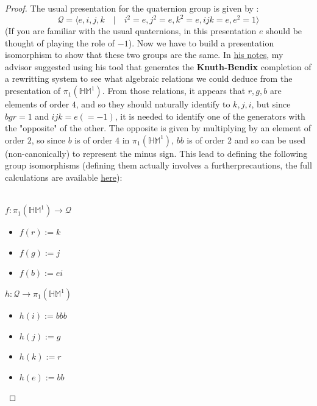 \documentclass{report}
\begin{document}
\begin{proof} The usual presentation for the quaternion group is given by : 
  $$\mathcal{Q}  = \langle e,i,j,k \quad \vert \quad i^2 =e, j^2=e, k^2=e, ijk=e, e^2=1 \rangle$$
  (If you are familiar with the usual quaternions, in this presentation $e$ should be thought of  playing the role of $-1$).
  Now we have to build a presentation isomorphism to show that these two groups are the same. In \href{https://github.com/dlaird-ens/Stage-L3/blob/main/Rapport/annexes/hypercubic.pdf}{his notes}, my advisor suggested using his tool that generates the \textbf{Knuth-Bendix} completion of a rewritting system to see what algebraic relations we could deduce from the presentation of $\pi_1(\mathbb{HM}^1)$. From those relations, it appears that $r,g,b$ are elements of order $4$, and so they should naturally identify to $k,j,i$, but since $bgr=1$ and $ijk=e(=-1)$, it is needed to identify one of the generators with the "opposite" of the other. The opposite is given by multiplying by an element of order $2$, so since $b$ is of order $4$ in $\pi_1(\mathbb{HM}^1)$, $bb$ is of order 2 and so can be used (non-canonically) to represent the minus sign. This lead to defining the following group isomorphisms (defining them actually involves a furtherprecautions, the full calculations are available \href{https://github.com/dlaird-ens/Stage-L3/blob/main/Rapport/annexes/Quaternions.pdf}{here}):\\\\
  \begin{minipage}{.5\textwidth} 
    $f : \pi_1(\mathbb{HM}^1) \rightarrow \mathcal{Q}$
    \begin{itemize}
      \item $f(r) := k$
      \item $f(g) := j$
      \item $f(b) :=ei$
    \end{itemize}
  \end{minipage}
  \hfill 
  \begin{minipage}{.5\textwidth} 
    $h : \mathcal{Q} \rightarrow \pi_1(\mathbb{HM}^1)$
    \begin{itemize}
      \item $h(i) := bbb$
      \item $h(j) := g$
      \item $h(k) := r$
      \item $h(e) :=bb$
    \end{itemize}
  \end{minipage}
\end{proof}
\end{document}
